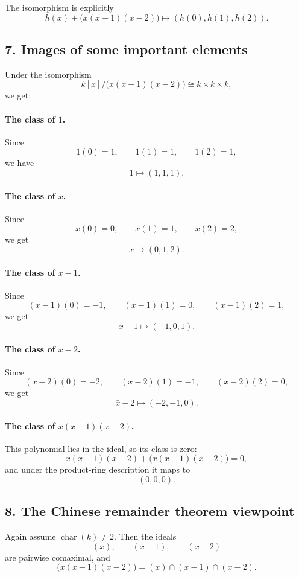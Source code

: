 \documentclass[12pt,a4paper]{article}
\theoremstyle{notespace}
\begin{document}
The isomorphism is explicitly
\[
h(x)+\bigl(x(x-1)(x-2)\bigr)\longmapsto (h(0),h(1),h(2)).
\]

\subsection*{7. Images of some important elements}

Under the isomorphism
\[
k[x]/\bigl(x(x-1)(x-2)\bigr)\cong k\times k\times k,
\]
we get:

\paragraph{The class of \(1\).}
Since
\[
1(0)=1,\qquad 1(1)=1,\qquad 1(2)=1,
\]
we have
\[
1\longmapsto (1,1,1).
\]

\paragraph{The class of \(x\).}
Since
\[
x(0)=0,\qquad x(1)=1,\qquad x(2)=2,
\]
we get
\[
\bar x\longmapsto (0,1,2).
\]

\paragraph{The class of \(x-1\).}
Since
\[
(x-1)(0)=-1,\qquad (x-1)(1)=0,\qquad (x-1)(2)=1,
\]
we get
\[
\bar x-1\longmapsto (-1,0,1).
\]

\paragraph{The class of \(x-2\).}
Since
\[
(x-2)(0)=-2,\qquad (x-2)(1)=-1,\qquad (x-2)(2)=0,
\]
we get
\[
\bar x-2\longmapsto (-2,-1,0).
\]

\paragraph{The class of \(x(x-1)(x-2)\).}
This polynomial lies in the ideal, so its class is zero:
\[
x(x-1)(x-2)+\bigl(x(x-1)(x-2)\bigr)=0,
\]
and under the product-ring description it maps to
\[
(0,0,0).
\]

\subsection*{8. The Chinese remainder theorem viewpoint}

Again assume \(\operatorname{char}(k)\neq 2\). Then the ideals
\[
(x),\qquad (x-1),\qquad (x-2)
\]
are pairwise comaximal, and
\[
\bigl(x(x-1)(x-2)\bigr)=(x)\cap(x-1)\cap(x-2).
\]
\end{document}
